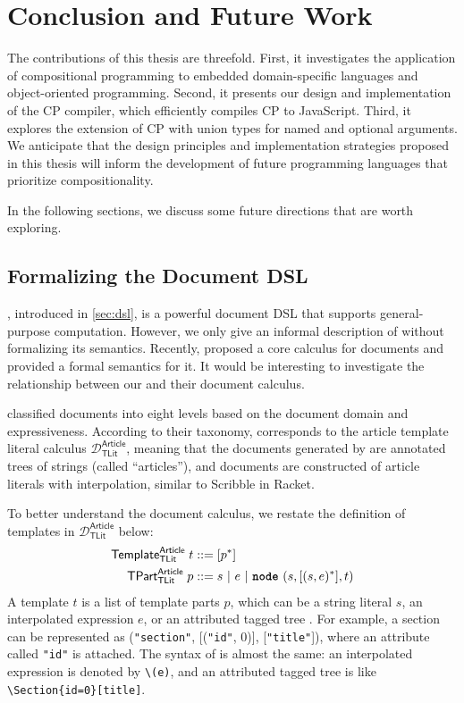 \chapter{Conclusion and Future Work} \label{ch:conclusion}

The contributions of this thesis are threefold. First, it investigates the
application of compositional programming to embedded domain-specific languages
and object-oriented programming. Second, it presents our design and
implementation of the CP compiler, which efficiently compiles CP to JavaScript.
Third, it explores the extension of CP with union types for named and optional
arguments. We anticipate that the design principles and implementation
strategies proposed in this thesis will inform the development of future
programming languages that prioritize compositionality.

In the following sections, we discuss some future directions that are worth
exploring.

\section{Formalizing the Document DSL}

\newcommand{\DArtTLit}{$\mathcal{D}^\mathsf{Article}_\mathsf{TLit}$\xspace}
\newcommand{\DArtTProg}{$\mathcal{D}^\mathsf{Article}_\mathsf{TProg}$\xspace}
\newcommand{\kw}[1]{\text{\ttfamily\bfseries #1}}

\ExT, introduced in \autoref{sec:dsl}, is a powerful document DSL that supports
general-purpose computation. However, we only give an informal description of
\ExT without formalizing its semantics. Recently, \citet{crichton2024core}
proposed a core calculus for documents and provided a formal semantics for it.
It would be interesting to investigate the relationship between our \ExT and
their document calculus.

\citeauthor{crichton2024core} classified documents into eight levels based on
the document domain and expressiveness. According to their taxonomy, \ExT
corresponds to the article template literal calculus \DArtTLit, meaning that the
documents generated by \ExT are annotated trees of strings (called
``articles''), and documents are constructed of article literals with
interpolation, similar to Scribble in Racket.

To better understand the document calculus, we restate the definition of
templates in \DArtTLit below:
\begin{align*}
\mathsf{Template}^\mathsf{Article}_\mathsf{TLit} \; t&::= [p^*] \\
   \mathsf{TPart}^\mathsf{Article}_\mathsf{TLit} \; p&::= s ~|~ e ~|~ \kw{node}\ (s, [(s,e)^*], t)
\end{align*}
A template $t$ is a list of template parts $p$, which can be a string literal
$s$, an interpolated expression $e$, or an attributed tagged tree \kw{node}. For
example, a section can be represented as \kw{node} (\lstinline{"section"},
[(\lstinline{"id"}, 0)], [\lstinline{"title"}]), where an attribute called
\lstinline{"id"} is attached. The syntax of \ExT is almost the same: an
interpolated expression is denoted by \lstinline{\(e)}, and an attributed tagged
tree is like \lstinline|\Section{id=0}[title]|.

